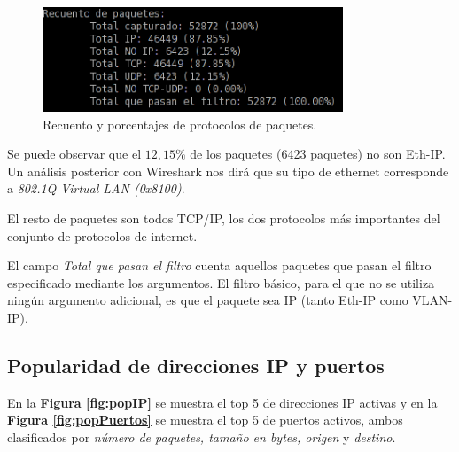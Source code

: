 \documentclass[a4paper, 11pt]{article}	%
\begin{document}
\begin{figure}[H]
\centering
\includegraphics[width=0.8\textwidth]{recuento.png}
\caption{Recuento y porcentajes de protocolos de paquetes.}
\label{fig:recuento}
\end{figure}

Se puede observar que el $12,15\%$ de los paquetes (6423 paquetes) no son Eth-IP. Un análisis posterior con Wireshark nos dirá que su tipo de ethernet corresponde a \textit{802.1Q Virtual LAN (0x8100)}.

El resto de paquetes son todos TCP/IP, los dos protocolos más importantes del conjunto de protocolos de internet.

El campo \textit{Total que pasan el filtro} cuenta aquellos paquetes que pasan el filtro especificado mediante los argumentos. El filtro básico, para el que no se utiliza ningún argumento adicional, es que el paquete sea IP (tanto Eth-IP como VLAN-IP).

\subsection{Popularidad de direcciones IP y puertos}
En la \textbf{Figura \ref{fig:popIP}} se muestra el top 5 de direcciones IP activas y en la \textbf{Figura \ref{fig:popPuertos}} se muestra el top 5 de puertos activos, ambos clasificados por \textit{número de paquetes, tamaño en bytes, origen} y \textit{destino}.
\end{document}
